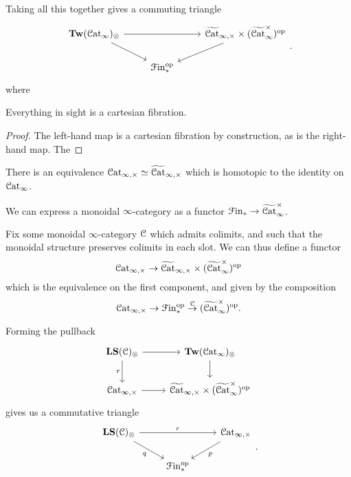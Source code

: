 \documentclass[main.tex]{subfiles}
\begin{document}
Taking all this together gives a commuting triangle
\begin{equation*}
  \begin{tikzcd}
    \Tw(\ICat)_{\otimes}
    \arrow[rr]
    \arrow[dr]
    && \TICatCart \times (\TICatCocart)\op
    \arrow[dl]
    \\
    & \Finp\op
  \end{tikzcd}.
\end{equation*}
where
\begin{proposition}
  Everything in sight is a cartesian fibration.
\end{proposition}
\begin{proof}
  The left-hand map is a cartesian fibration by construction, as is the right-hand map. The 
\end{proof}

\begin{proposition}
  There is an equivalence $\mathcal{C}\mathrm{at}_{\infty,\times} \simeq \widetilde{\mathcal{C}\mathrm{at}}_{\infty,\times}$ which is homotopic to the identity on $\mathcal{C}\mathrm{at}_{\infty}$.
\end{proposition}

\begin{proposition}
  We can express a monoidal $\infty$-category as a functor $\mathcal{F}\mathrm{in}_{*} \to \widetilde{\mathcal{C}\mathrm{at}}_{\infty}^{\times}$.
\end{proposition}

Fix some monoidal $\infty$-category $\mathcal{C}$ which admits colimits, and such that the monoidal structure preserves colimits in each slot. We can thus define a functor
\begin{equation*}
  \mathcal{C}\mathrm{at}_{\infty,\times} \to \widetilde{\mathcal{C}\mathrm{at}}_{\infty,\times} \times (\widetilde{\mathcal{C}\mathrm{at}}_{\infty}^{\times})^{\mathrm{op}}
\end{equation*}
which is the equivalence on the first component, and given by the composition
\begin{equation*}
  \mathcal{C}\mathrm{at}_{\infty,\times} \to \mathcal{F}\mathrm{in}_{*}^{\mathrm{op}} \overset{\mathcal{C}}{\to} (\widetilde{\mathcal{C}\mathrm{at}}_{\infty}^{\times})^{\mathrm{op}}.
\end{equation*}

Forming the pullback
\begin{equation*}
  \begin{tikzcd}
    \LS(\category{C})_{\otimes}
    \arrow[r]
    \arrow[d, swap, "r"]
    & \Tw(\ICat)_{\otimes}
    \arrow[d]
    \\
    \ICatCart
    \arrow[r]
    & \TICatCart \times (\TICatCocart)\op
  \end{tikzcd}
\end{equation*}
gives us a commutative triangle
\begin{equation*}
  \begin{tikzcd}
    \LS(\category{C})_{\otimes}
    \arrow[rr, "r"]
    \arrow[dr, swap, "q"]
    && \ICatCart
    \arrow[dl, "p"]
    \\
    & \Finp\op
  \end{tikzcd}.
\end{equation*}
\end{document}
